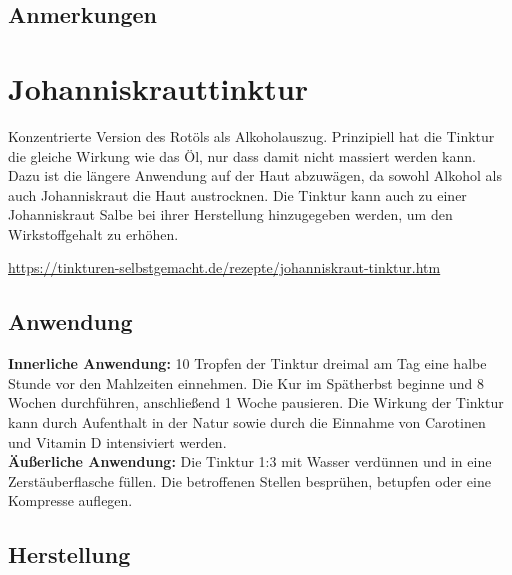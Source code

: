 \subsection{Anmerkungen}







\section{Johanniskrauttinktur}

Konzentrierte Version des Rotöls als Alkoholauszug. Prinzipiell hat die Tinktur die gleiche Wirkung wie das Öl, nur dass damit nicht massiert werden kann. Dazu ist die längere Anwendung auf der Haut abzuwägen, da sowohl Alkohol als auch Johanniskraut die Haut austrocknen. Die Tinktur kann auch zu einer Johanniskraut Salbe bei ihrer Herstellung hinzugegeben werden, um den Wirkstoffgehalt zu erhöhen.

\cite{tinkturen} \cite{nedoma2018heiltinkturen}

\url{https://tinkturen-selbstgemacht.de/rezepte/johanniskraut-tinktur.htm}

     
       

\subsection{Anwendung}

\textbf{Innerliche Anwendung:} 10 Tropfen der Tinktur dreimal am Tag eine halbe Stunde vor den Mahlzeiten einnehmen. Die Kur im Spätherbst beginne und 8 Wochen durchführen, anschließend 1 Woche pausieren. Die Wirkung der Tinktur kann durch Aufenthalt in der Natur sowie durch die Einnahme von Carotinen und Vitamin D intensiviert werden.\\

\textbf{Äußerliche Anwendung:} Die Tinktur 1:3 mit Wasser verdünnen und in eine Zerstäuberflasche füllen. Die betroffenen Stellen besprühen, betupfen oder eine Kompresse auflegen.\\

\subsection{Herstellung}

